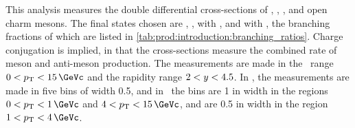 This analysis measures the double differential cross-sections of \PDzero, \PDp, 
\PDsplus, and \PDstarp open charm mesons.\footnotemark
The final states chosen are \DzToKpi, \DpToKpipi, \DspTophipi with \phiToKK, 
and \DstToDzpi with \DzToKpi, the branching fractions of which are listed in 
\cref{tab:prod:introduction:branching_ratios}.
Charge conjugation is implied, in that the cross-sections measure the combined 
rate of meson and anti-meson production.
The measurements are made in the \pT\ range $0 < \pT < \SI{15}{\GeVc}$ and the 
rapidity range $2 < y < 4.5$.
In \rapidity, the measurements are made in five bins of width 0.5, and in \pT\ 
the bins are \SI{1}{\GeVc} in width in the regions $0 < \pT < \SI{1}{\GeVc}$ 
and $4 < \pT < \SI{15}{\GeVc}$, and are \SI{0.5}{\GeVc} in width in the region 
$1 < \pT < \SI{4}{\GeVc}$.


\begin{table}
  \centering
  \caption{%
      Branching ratios for the different decay 
      modes~\cite{PDG2014,Alexander:2008aa}.
  }
  \label{tab:prod:introduction:branching_ratios}
  
\end{table}

